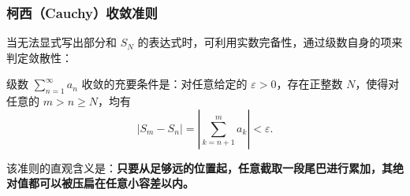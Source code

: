 \subsubsection{柯西（Cauchy）收敛准则}
当无法显式写出部分和 \(S_N\) 的表达式时，可利用实数完备性，通过级数自身的项来判定敛散性：

\begin{theorem}
级数 \(\sum_{n=1}^{\infty} a_n\) 收敛的充要条件是：对任意给定的 \(\varepsilon > 0\)，存在正整数 \(N\)，使得对任意的 \(m > n \ge N\)，均有
\[
\left| S_m - S_n \right| = \left| \sum_{k=n+1}^{m} a_k \right| < \varepsilon.
\]
\end{theorem}

该准则的直观含义是：\textbf{只要从足够远的位置起，任意截取一段尾巴进行累加，其绝对值都可以被压扁在任意小容差以内。}